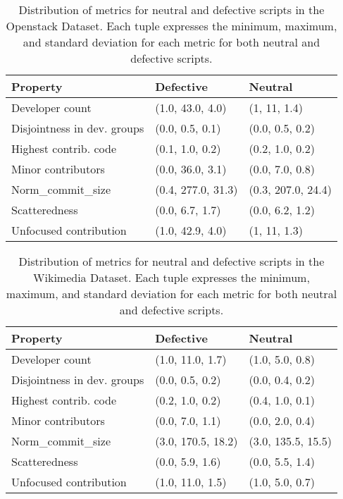 \documentclass[smallextended]{svjour3}       %
\begin{document}
\begin{table*}[]
\captionsetup{justification=centering}
\caption{Distribution of metrics for neutral and defective scripts in the Openstack Dataset. Each tuple expresses the minimum, maximum, and standard deviation for each metric for both neutral and defective scripts.} 
\label{table-rq1-dist-ost}
\footnotesize
{
\begin{tabular}{p{4.5cm} p{2.5cm} p{2.5cm}  }
\hline
\textbf{Property}   & \textbf{Defective} & \textbf{Neutral} \\
\hline
Developer count              &  (1.0, 43.0, 4.0)   & (1, 11, 1.4)         \\ 
\hline
Disjointness in dev. groups  &  (0.0, 0.5, 0.1)    & (0.0, 0.5, 0.2)          \\ 
\hline
Highest contrib. code        &  (0.1, 1.0, 0.2)    & (0.2, 1.0, 0.2)       \\ 
\hline
Minor contributors           &  (0.0, 36.0, 3.1)   & (0.0, 7.0, 0.8)         \\ 
\hline
Norm\_commit\_size           &  (0.4, 277.0, 31.3) & (0.3, 207.0, 24.4)    \\ 
\hline
Scatteredness                &  (0.0, 6.7, 1.7)    & (0.0, 6.2, 1.2)          \\ 
\hline
Unfocused contribution       &  (1.0, 42.9, 4.0)   & (1, 11, 1.3)          \\
\hline
\end{tabular}
}
\end{table*} 

\begin{table*}[]
\captionsetup{justification=centering}
\caption{Distribution of metrics for neutral and defective scripts in the Wikimedia Dataset. Each tuple expresses the minimum, maximum, and standard deviation for each metric for both neutral and defective scripts.} 
\label{table-rq1-dist-wik}
\footnotesize
{
\begin{tabular}{p{4.5cm} p{2.5cm} p{2.5cm}  }
\hline
\textbf{Property}   & \textbf{Defective} & \textbf{Neutral} \\
\hline
Developer count              &  (1.0, 11.0, 1.7)  & (1.0, 5.0, 0.8)        \\ 
\hline
Disjointness in dev. groups  &  (0.0, 0.5, 0.2)   & (0.0, 0.4, 0.2)            \\ 
\hline
Highest contrib. code        &  (0.2, 1.0, 0.2)   & (0.4, 1.0, 0.1)       \\ 
\hline
Minor contributors           &  (0.0, 7.0, 1.1)   & (0.0, 2.0, 0.4)             \\ 
\hline
Norm\_commit\_size           &  (3.0, 170.5, 18.2)& (3.0, 135.5, 15.5)     \\ 
\hline
Scatteredness                &  (0.0, 5.9, 1.6)   & (0.0, 5.5, 1.4)        \\ 
\hline
Unfocused contribution       &  (1.0, 11.0, 1.5)  & (1.0, 5.0, 0.7)         \\
\hline
\end{tabular}
}
\end{table*} 
\end{document}
